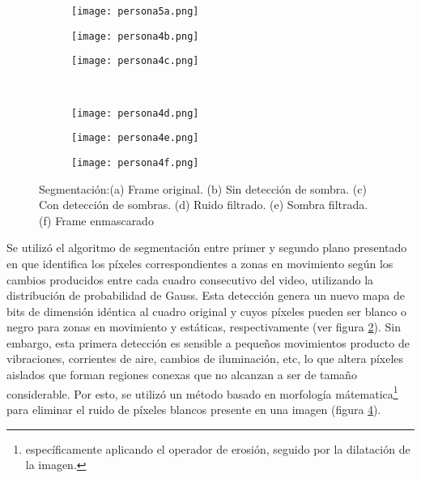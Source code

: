 \documentclass[../memoria.tex]{subfiles}
\begin{document}
\begin{figure}
    \centering
      \begin{subfigure}{0.3\textwidth}
        \texttt{[image: persona5a.png]}
          \caption{}
          \label{fig:segmentacion:original}
      \end{subfigure}
      \hfill
      \begin{subfigure}{0.3\textwidth}
        \texttt{[image: persona4b.png]}
          \caption{}
          \label{fig:segmentacion:sin detec sombra}
      \end{subfigure}
      \hfill
      \begin{subfigure}{0.3\textwidth}
        \texttt{[image: persona4c.png]}
          \caption{}
          \label{fig:segmentacion:con detec sombra}
      \end{subfigure}
      \\
      \begin{subfigure}{0.3\textwidth}
        \texttt{[image: persona4d.png]}
          \caption{}
          \label{fig:segmentacion:ruido filtrado}
      \end{subfigure}
      \hfill
      \begin{subfigure}{0.3\textwidth}
        \texttt{[image: persona4e.png]}
          \caption{}
          \label{fig:segmentacion:sombra filtrada}
      \end{subfigure}
      \hfill
      \begin{subfigure}{0.3\textwidth}
        \texttt{[image: persona4f.png]}
          \caption{}
          \label{fig:segmentacion:original enmascarado}
      \end{subfigure}
\caption{
\label{fig:segmentacion}
Segmentación:(a) Frame original. (b) Sin detección de sombra. (c) Con detección de sombras. (d) Ruido filtrado. (e) Sombra filtrada. (f) Frame enmascarado}
\end{figure}

Se utilizó el algoritmo de segmentación entre primer y segundo plano presentado en \cite{zivkovic2004improved,zivkovic2006efficient} que identifica los píxeles correspondientes a zonas en movimiento según los cambios producidos entre cada cuadro consecutivo del video, utilizando la distribución de probabilidad de Gauss. Esta detección genera un nuevo mapa de bits de dimensión idéntica al cuadro original y cuyos píxeles pueden ser blanco o negro para zonas en movimiento y estáticas, respectivamente (ver figura \ref{fig:segmentacion:sin detec sombra}). Sin embargo, esta primera detección es sensible a pequeños movimientos producto de vibraciones, corrientes de aire, cambios de iluminación, etc, lo que altera píxeles aislados que forman regiones conexas que no alcanzan a ser de tamaño considerable. Por esto, se utilizó un método basado en morfología mátematica\footnote{específicamente aplicando el operador de erosión, seguido por la dilatación de la imagen.} para eliminar el ruido de píxeles blancos presente en una imagen (figura \ref{fig:segmentacion:ruido filtrado}).
\end{document}
